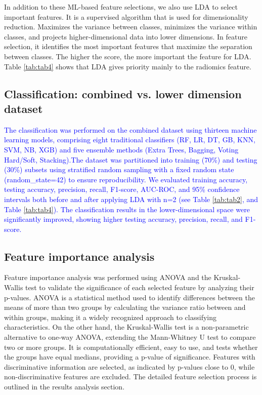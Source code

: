 \documentclass[twocolumn]{article}
\begin{document}
In addition to these ML-based feature selections, we also use LDA to select important features. It is a supervised algorithm that is used for dimensionality reduction. Maximizes the variance between classes, minimizes the variance within classes, and projects higher-dimensional data into lower dimensions. In feature selection, it identifies the most important features that maximize the separation between classes. The higher the score, the more important the feature for LDA. Table \ref{tab:tab4} shows that LDA gives priority mainly to the radiomics feature.

\subsection{Classification: combined vs. lower dimension dataset}
\textcolor{blue}{The classification was performed on the combined dataset using thirteen machine learning models, comprising eight traditional classifiers (RF, LR, DT, GB, KNN, SVM, NB, XGB) and five ensemble methods (Extra Trees, Bagging, Voting Hard/Soft, Stacking).The dataset was partitioned into training (70\%) and testing (30\%) subsets using stratified random sampling with a fixed random state (random\_state=42) to ensure reproducibility. We evaluated training accuracy, testing accuracy, precision, recall, F1-score, AUC-ROC, and 95\% confidence intervals both before and after applying LDA with n=2 (see Table \ref{tab:tab2}, and Table \ref{tab:tab4}). The classification results in the lower-dimensional space were significantly improved, showing higher testing accuracy, precision, recall, and F1-score.}


\subsection{Feature importance analysis}

Feature importance analysis was performed using ANOVA and the Kruskal-Wallis test to validate the significance of each selected feature by analyzing their p-values. ANOVA is a statistical method used to identify differences between the means of more than two groups by calculating the variance ratio between and within groups, making it a widely recognized approach to classifying characteristics. On the other hand, the Kruskal-Wallis test \cite{ali2014kruskal} is a non-parametric alternative to one-way ANOVA, extending the Mann-Whitney U test to compare two or more groups. It is computationally efficient, easy to use, and tests whether the groups have equal medians, providing a p-value of significance. Features with discriminative information are selected, as indicated by p-values close to 0, while non-discriminative features are excluded. The detailed feature selection process is outlined in the results analysis section.
\end{document}
